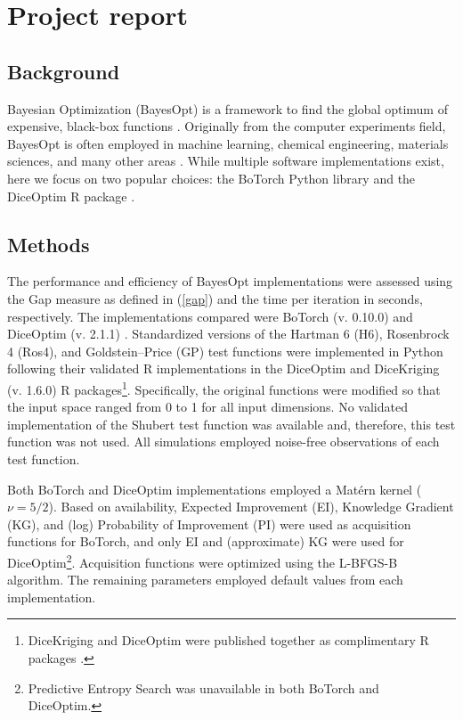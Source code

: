

\section{Project report}
\subsection{Background}
Bayesian Optimization (BayesOpt) is a framework to find the global optimum of expensive, black-box functions \cite{Frazier2018}. Originally from the computer experiments field, BayesOpt is often employed in machine learning, chemical engineering, materials sciences, and many other areas \cite{Garnett2023}. While multiple software implementations exist, here we focus on two popular choices: the BoTorch Python library \cite{Balandat2019} and the DiceOptim R package \cite{Roustant2012}.
\subsection{Methods}
The performance and efficiency of BayesOpt implementations were assessed using the Gap measure as defined in (\ref{gap}) and the time per iteration in seconds, respectively. The implementations compared were BoTorch (v. 0.10.0) and DiceOptim (v. 2.1.1) \cite{Roustant2012, Balandat2019}. Standardized versions of the Hartman 6 (H6), Rosenbrock 4 (Ros4), and Goldstein–Price (GP) test functions were implemented in Python following their validated R implementations in the DiceOptim and DiceKriging (v. 1.6.0) R packages\footnote{DiceKriging and DiceOptim were published together as complimentary R packages \cite{Roustant2012}.}. Specifically, the original functions were modified so that the input space ranged from 0 to 1 for all input dimensions. No validated implementation of the Shubert test function was available and, therefore, this test function was not used. All simulations employed noise-free observations of each test function.

Both BoTorch and DiceOptim implementations employed a Matérn kernel ($\nu=5/2$). Based 
on availability, Expected Improvement (EI), Knowledge Gradient (KG), and (log) Probability of Improvement (PI) were used as acquisition functions for BoTorch, and only EI and (approximate) KG were used for DiceOptim\footnote{Predictive Entropy Search was unavailable in both BoTorch and DiceOptim.}. Acquisition functions were optimized using the L-BFGS-B algorithm. The remaining parameters employed default values from each implementation.

